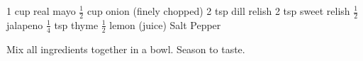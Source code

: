 \dishtype{\vegetarian, \sauce}
\begin{ingreds}
    1 cup real mayo
    $\frac{1}{2}$ cup onion (finely chopped)
    2 tsp dill relish
    2 tsp sweet relish
    $\frac{1}{2}$ jalapeno 
    $\frac{1}{4}$ tsp thyme
    $\frac{1}{2}$ lemon (juice)
    Salt
    Pepper
\end{ingreds}
\begin{method}
    Mix all ingredients together in a bowl.
    Season to taste.
\end{method}